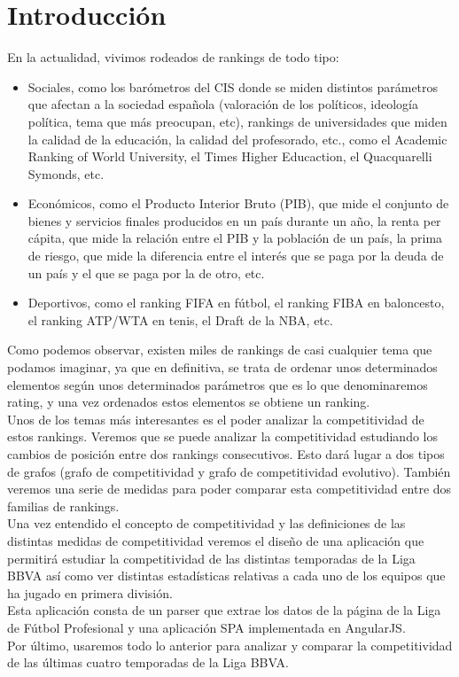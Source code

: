 \chapter{Introducción}

En la actualidad, vivimos rodeados de rankings de todo tipo: 
\begin{itemize}
\item Sociales, como los barómetros del CIS donde se miden distintos parámetros que afectan a la sociedad española (valoración de los políticos, ideología política, tema que más preocupan, etc), rankings de universidades que miden la calidad de la educación, la calidad del profesorado, etc., como el Academic Ranking of World University, el Times Higher Educaction, el Quacquarelli Symonds, etc.
\item Económicos, como el Producto Interior Bruto (PIB), que mide el conjunto de bienes y servicios finales producidos en un país durante un año, la renta per cápita, que mide la relación entre el PIB y la población de un país, la prima de riesgo, que mide la diferencia entre el interés que se paga por la deuda de un país y el que se paga por la de otro, etc.
\item Deportivos, como el ranking FIFA en fútbol, el ranking FIBA en baloncesto, el ranking ATP/WTA en tenis, el Draft de la NBA, etc.
\end{itemize}

Como podemos observar, existen miles de rankings de casi cualquier tema que podamos imaginar, ya que en definitiva, se trata de ordenar unos determinados elementos según unos determinados parámetros que es lo que denominaremos rating, y una vez ordenados estos elementos se obtiene un ranking.\\

Unos de los temas más interesantes es el poder analizar la competitividad de estos rankings. Veremos que se puede analizar la competitividad estudiando los cambios de posición entre dos rankings consecutivos. Esto dará lugar a dos tipos de grafos (grafo de competitividad y grafo de competitividad evolutivo). También veremos una serie de medidas para poder comparar esta competitividad entre dos familias de rankings.\\

Una vez entendido el concepto de competitividad y las definiciones de las distintas medidas de competitividad veremos el diseño de una aplicación que permitirá estudiar la competitividad de las distintas temporadas de la Liga BBVA así como ver distintas estadísticas relativas a cada uno de los equipos que ha jugado en primera división.\\
Esta aplicación consta de un parser que extrae los datos de la página de la Liga de Fútbol Profesional y una aplicación SPA implementada en AngularJS.\\

Por último, usaremos todo lo anterior para analizar y comparar la competitividad de las últimas cuatro temporadas de la Liga BBVA.